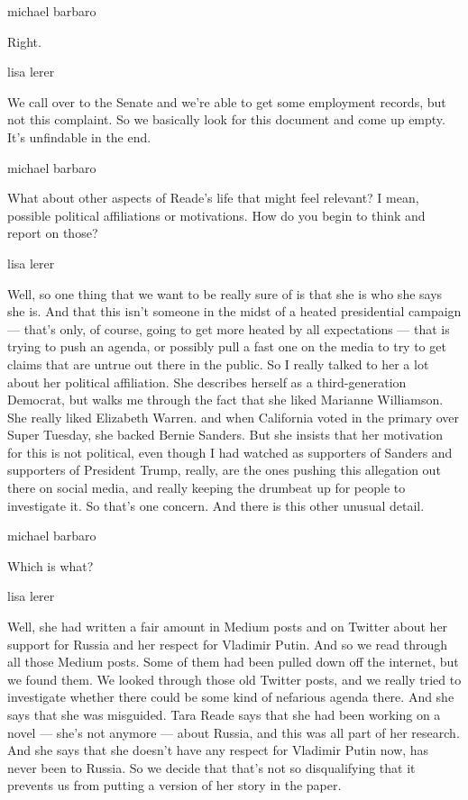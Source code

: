 michael barbaro

Right.

lisa lerer

We call over to the Senate and we're able to get some employment
records, but not this complaint. So we basically look for this document
and come up empty. It's unfindable in the end.

michael barbaro

What about other aspects of Reade's life that might feel relevant? I
mean, possible political affiliations or motivations. How do you begin
to think and report on those?

lisa lerer

Well, so one thing that we want to be really sure of is that she is who
she says she is. And that this isn't someone in the midst of a heated
presidential campaign --- that's only, of course, going to get more
heated by all expectations --- that is trying to push an agenda, or
possibly pull a fast one on the media to try to get claims that are
untrue out there in the public. So I really talked to her a lot about
her political affiliation. She describes herself as a third-generation
Democrat, but walks me through the fact that she liked Marianne
Williamson. She really liked Elizabeth Warren. and when California voted
in the primary over Super Tuesday, she backed Bernie Sanders. But she
insists that her motivation for this is not political, even though I had
watched as supporters of Sanders and supporters of President Trump,
really, are the ones pushing this allegation out there on social media,
and really keeping the drumbeat up for people to investigate it. So
that's one concern. And there is this other unusual detail.

michael barbaro

Which is what?

lisa lerer

Well, she had written a fair amount in Medium posts and on Twitter about
her support for Russia and her respect for Vladimir Putin. And so we
read through all those Medium posts. Some of them had been pulled down
off the internet, but we found them. We looked through those old Twitter
posts, and we really tried to investigate whether there could be some
kind of nefarious agenda there. And she says that she was misguided.
Tara Reade says that she had been working on a novel --- she's not
anymore --- about Russia, and this was all part of her research. And she
says that she doesn't have any respect for Vladimir Putin now, has never
been to Russia. So we decide that that's not so disqualifying that it
prevents us from putting a version of her story in the paper.

